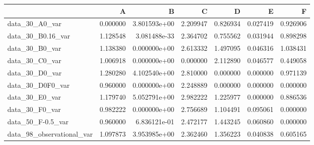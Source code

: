 \begin{tabular}{lrrrrrr}
\toprule
{} &         A &             B &         C &         D &         E &         F \\
\midrule
data\_30\_A0\_var            &  0.000000 &  3.801593e+00 &  2.209947 &  0.826934 &  0.027419 &  0.926906 \\
data\_30\_B0.16\_var         &  1.128548 &  3.081488e-33 &  2.364702 &  0.755562 &  0.031944 &  0.898298 \\
data\_30\_B0\_var            &  1.138380 &  0.000000e+00 &  2.613332 &  1.497095 &  0.046316 &  1.038431 \\
data\_30\_C0\_var            &  1.006918 &  0.000000e+00 &  0.000000 &  2.112890 &  0.046577 &  0.449058 \\
data\_30\_D0\_var            &  1.280280 &  4.102540e+00 &  2.810000 &  0.000000 &  0.000000 &  0.971139 \\
data\_30\_D0F0\_var          &  0.960000 &  0.000000e+00 &  2.248889 &  0.000000 &  0.000000 &  0.000000 \\
data\_30\_E0\_var            &  1.179740 &  5.052791e+00 &  2.982222 &  1.225977 &  0.000000 &  0.886536 \\
data\_30\_F0\_var            &  0.982222 &  0.000000e+00 &  2.756689 &  1.104491 &  0.095061 &  0.000000 \\
data\_50\_F-0.5\_var         &  0.960000 &  6.836121e-01 &  2.472177 &  1.443245 &  0.060860 &  0.000000 \\
data\_98\_observational\_var &  1.097873 &  3.953985e+00 &  2.362460 &  1.356223 &  0.040838 &  0.605165 \\
\bottomrule
\end{tabular}
